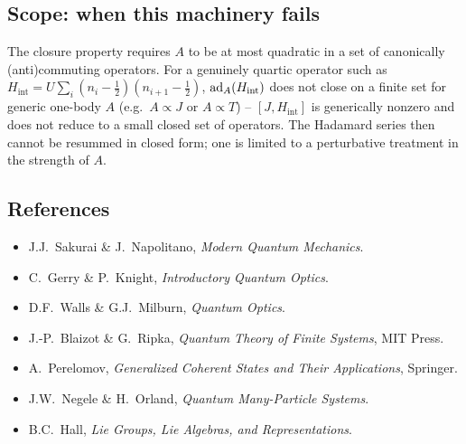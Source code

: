 \documentclass[../main.tex]{subfiles}
\begin{document}
\subsection{Scope: when this machinery fails}
The closure property requires $A$ to be at most quadratic in a set of canonically
(anti)commuting operators. For a genuinely quartic operator such as
$H_{\mathrm{int}}=U\sum_i(n_i-\tfrac12)(n_{i+1}-\tfrac12)$, $\mathrm{ad}_A(H_{\mathrm{int}})$
does not close on a finite set for generic one-body $A$ (e.g.\ $A\propto J$ or
$A\propto T$) -- $[J,H_{\mathrm{int}}]$ is generically nonzero and does not reduce to a
small closed set of operators. The Hadamard series then cannot be resummed in closed
form; one is limited to a perturbative treatment in the strength of $A$.

\subsection{References}
\begin{itemize}
\item J.J.\ Sakurai \& J.\ Napolitano, \emph{Modern Quantum Mechanics}.
\item C.\ Gerry \& P.\ Knight, \emph{Introductory Quantum Optics}.
\item D.F.\ Walls \& G.J.\ Milburn, \emph{Quantum Optics}.
\item J.-P.\ Blaizot \& G.\ Ripka, \emph{Quantum Theory of Finite Systems}, MIT Press.
\item A.\ Perelomov, \emph{Generalized Coherent States and Their Applications}, Springer.
\item J.W.\ Negele \& H.\ Orland, \emph{Quantum Many-Particle Systems}.
\item B.C.\ Hall, \emph{Lie Groups, Lie Algebras, and Representations}.
\end{itemize}
\end{document}
